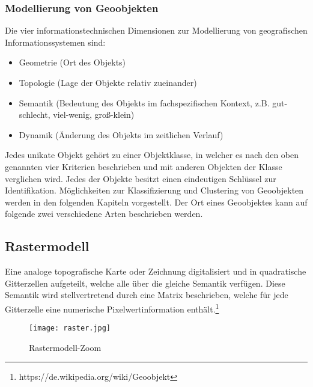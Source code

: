 \documentclass[11pt,ceqn]{book}
\begin{document}
\subsubsection{Modellierung von Geoobjekten}
Die vier informationstechnischen Dimensionen zur Modellierung von geografischen Informationssystemen sind:
\begin{itemize}
\item Geometrie (Ort des Objekts)
\item Topologie (Lage der Objekte relativ zueinander)
\item Semantik (Bedeutung des Objekts im fachspezifischen Kontext, z.B. gut-schlecht, viel-wenig, groß-klein)
\item Dynamik (Änderung des Objekts im zeitlichen Verlauf)
\end{itemize}
Jedes unikate Objekt gehört zu einer Objektklasse, in welcher es nach den oben genannten vier Kriterien beschrieben und mit anderen Objekten der Klasse verglichen wird. Jedes der Objekte besitzt einen eindeutigen Schlüssel zur Identifikation. Möglichkeiten zur Klassifizierung und Clustering von Geoobjekten werden in den folgenden Kapiteln vorgestellt.\newline
Der Ort eines Geoobjektes kann auf folgende zwei verschiedene Arten beschrieben werden.

\subsection{Rastermodell}
Eine analoge topografische Karte oder Zeichnung digitalisiert und in quadratische Gitterzellen aufgeteilt, welche alle über die gleiche Semantik verfügen. Diese Semantik wird stellvertretend durch eine Matrix beschrieben, welche für jede Gitterzelle eine numerische Pixelwertinformation enthält.\footnote{https://de.wikipedia.org/wiki/Geoobjekt}
\begin{figure}[H]
\centering
\texttt{[image: raster.jpg]}
\caption{Rastermodell-Zoom \protect\footnotemark}
\end{figure}
\end{document}
